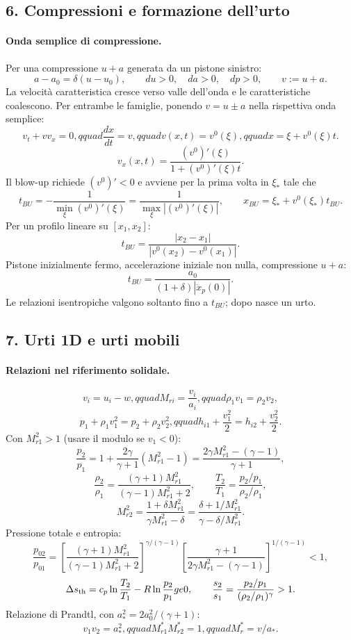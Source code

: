 \documentclass[11pt,a4paper]{article}
\begin{document}

\subsection*{6. Compressioni e formazione dell'urto}

\paragraph*{Onda semplice di compressione.}
Per una compressione $u+a$ generata da un pistone sinistro:
\[
a-a_0=\delta(u-u_0),\qquad du>0,\quad da>0,\quad dp>0,
\qquad v:=u+a.
\]
La velocità caratteristica cresce verso valle dell'onda e le caratteristiche coalescono.
Per entrambe le famiglie, ponendo $v=u\pm a$ nella rispettiva onda semplice:
\[
v_t+v v_x=0,qquad \frac{dx}{dt}=v,qquad v(x,t)=v^0(\xi),qquad
x=\xi+v^0(\xi)t.
\]
\[
v_x(x,t)=\frac{(v^0)'(\xi)}{1+(v^0)'(\xi)t}.
\]
Il blow-up richiede $(v^0)'<0$ e avviene per la prima volta in $\xi_*$ tale che
\[
t_{BU}=-\frac{1}{\min_\xi (v^0)'(\xi)}
=\frac{1}{\max_\xi |(v^0)'(\xi)|},\qquad
x_{BU}=\xi_*+v^0(\xi_*)t_{BU}.
\]
Per un profilo lineare su $[x_1,x_2]$:
\[
t_{BU}=\frac{|x_2-x_1|}{|v^0(x_2)-v^0(x_1)|}.
\]
Pistone inizialmente fermo, accelerazione iniziale non nulla, compressione $u+a$:
\[
t_{BU}=\frac{a_0}{(1+\delta)|\ddot x_p(0)|}.
\]
Le relazioni isentropiche valgono soltanto fino a $t_{BU}$; dopo nasce un urto.

\subsection*{7. Urti 1D e urti mobili}

\paragraph*{Relazioni nel riferimento solidale.}
\[
v_i=u_i-w,qquad M_{ri}=\frac{v_i}{a_i},qquad
\rho_1v_1=\rho_2v_2,
\]
\[
p_1+\rho_1v_1^2=p_2+\rho_2v_2^2,qquad
h_{i1}+\frac{v_1^2}{2}=h_{i2}+\frac{v_2^2}{2}.
\]
Con $M_{r1}^2>1$ (usare il modulo se $v_1<0$):
\[
\frac{p_2}{p_1}=1+\frac{2\gamma}{\gamma+1}(M_{r1}^2-1)
=\frac{2\gamma M_{r1}^2-(\gamma-1)}{\gamma+1},
\]
\[
\frac{\rho_2}{\rho_1}=\frac{(\gamma+1)M_{r1}^2}{(\gamma-1)M_{r1}^2+2},
\qquad
\frac{T_2}{T_1}=\frac{p_2/p_1}{\rho_2/\rho_1},
\]
\[
M_{r2}^2=\frac{1+\delta M_{r1}^2}{\gamma M_{r1}^2-\delta}
=\frac{\delta+1/M_{r1}^2}{\gamma-\delta/M_{r1}^2}.
\]
Pressione totale e entropia:
\[
\frac{p_{02}}{p_{01}}=
\left[\frac{(\gamma+1)M_{r1}^2}{(\gamma-1)M_{r1}^2+2}\right]^{\gamma/(\gamma-1)}
\left[\frac{\gamma+1}{2\gamma M_{r1}^2-(\gamma-1)}\right]^{1/(\gamma-1)}<1,
\]
\[
\Delta s_{\rm th}=c_p\ln\frac{T_2}{T_1}-R\ln\frac{p_2}{p_1}ge0,
\qquad \frac{s_2}{s_1}=\frac{p_2/p_1}{(\rho_2/\rho_1)^\gamma}>1.
\]
Relazione di Prandtl, con $a_*^2=2a_0^2/(\gamma+1)$:
\[
v_1v_2=a_*^2,qquad M_{r1}^*M_{r2}^*=1,qquad M_r^*=v/a_*.
\]
\end{document}
